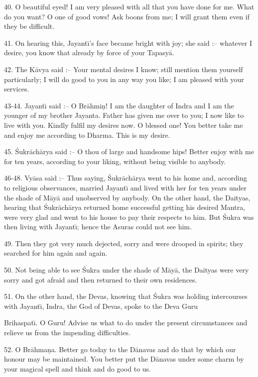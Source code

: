 40. O beautiful eyed! I am very pleased with all that you have done for me. What do you want? O one of good vows! Ask boons from me; I will grant them even if they be difficult.

41. On hearing this, Jayant\={\i}'s face became bright with joy; she said :-- whatever I desire, you know that already by force of your Tapasy\=a.

42. The K\=avya said :-- Your mental desires I know; still mention them yourself particularly; I will do good to you in any way you like; I am pleased with your services.

43-44. Jayant\={\i} said :-- O Br\=ahmi\d{n}! I am the daughter of Indra and I am the younger of my brother Jayanta. Father has given me over to you; I now like to live with you. Kindly fulfil my desires now. O blessed one! You better take me and enjoy me according to Dharma. This is my desire.

45. \'Sukr\=ach\=arya said :-- O thou of large and handsome hips! Better enjoy with me for ten years, according to your liking, without being visible to anybody.

46-48. Vy\=asa said :-- Thus saying, \'Sukr\=ach\=arya went to his home and, according to religious observances, married Jayant\={\i} and lived with her for ten years under the shade of M\=ay\=a and unobserved by anybody. On the other hand, the Daityas, hearing that \'Sukr\=ach\=arya returned home successful getting his desired Mantra, were very glad and went to his house to pay their respects to him. But \'Sukra was then living with Jayant\={\i}; hence the Asuras could not see him.

49. Then they got very much dejected, sorry and were drooped in spirits; they searched for him again and again.

50. Not being able to see \'Sukra under the shade of M\=ay\=a, the Daityas were very sorry and got afraid and then returned to their own residences.

51. On the other hand, the Devas, knowing that \'Sukra was holding intercourses with Jayant\={\i}, Indra, the God of Devas, spoke to the Deva Guru

Brihaspat\={\i}. O Guru! Advise us what to do under the present circumstances and relieve us from the impending difficulties.

52. O Br\=ahma\d{n}a. Better go today to the D\=anavas and do that by which our honour may be maintained. You better put the D\=anavas under some charm by your magical spell and think and do good to us.

